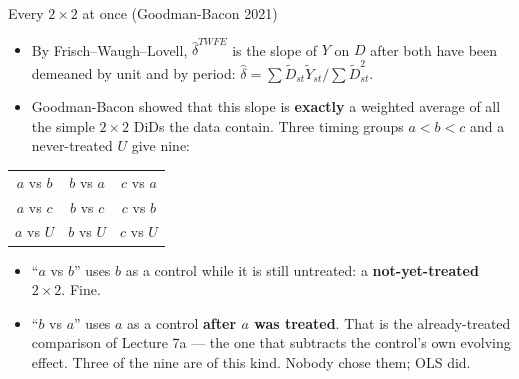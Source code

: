 \documentclass[
  11pt,
  ignorenonframetext,
  aspectratio=169,
]{beamer}
\providecommand{\tightlist}{%
  \setlength{\itemsep}{0pt}\setlength{\parskip}{0pt}}
\begin{document}
\begin{frame}{Every \(2 \times 2\) at once (Goodman-Bacon 2021)}
\protect{}\label{every-2-times-2-at-once-goodman-bacon-2021}
\begin{itemize}
\tightlist
\item
  By Frisch--Waugh--Lovell, \(\hat\delta^{TWFE}\) is the slope of \(Y\)
  on \(D\) after both have been demeaned by unit and by period:
  \(\hat\delta = \sum \tilde D_{st}\tilde Y_{st} \big/ \sum \tilde D_{st}^2\).
\item
  Goodman-Bacon showed that this slope is \textbf{exactly} a weighted
  average of all the simple \(2 \times 2\) DiDs the data contain. Three
  timing groups \(a < b < c\) and a never-treated \(U\) give nine:
\end{itemize}

\begin{center}\small
\begin{tabular}{ccc}
\toprule
$a$ vs $b$ & $b$ vs $a$ & $c$ vs $a$ \\
$a$ vs $c$ & $b$ vs $c$ & $c$ vs $b$ \\
$a$ vs $U$ & $b$ vs $U$ & $c$ vs $U$ \\
\bottomrule
\end{tabular}
\end{center}

\begin{itemize}
\tightlist
\item
  ``\(a\) vs \(b\)'' uses \(b\) as a control while it is still
  untreated: a \textbf{not-yet-treated} \(2 \times 2\). Fine.
\item
  ``\(b\) vs \(a\)'' uses \(a\) as a control \textbf{after \(a\) was
  treated}. That is the already-treated comparison of Lecture 7a --- the
  one that subtracts the control's own evolving effect. Three of the
  nine are of this kind. Nobody chose them; OLS did.
\end{itemize}
\end{frame}
\end{document}
